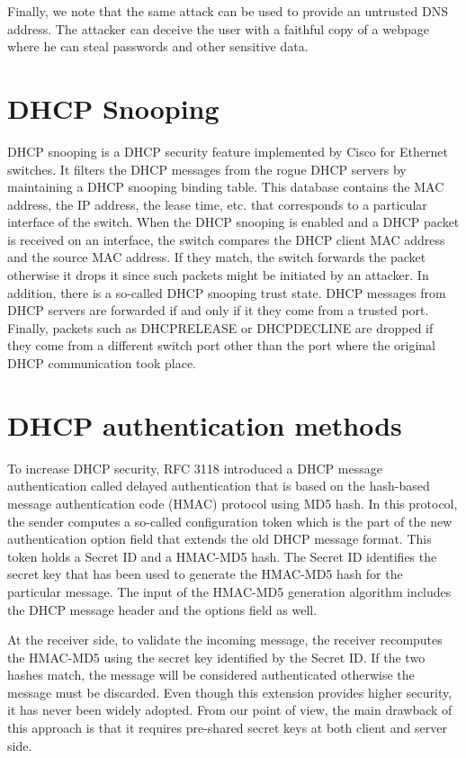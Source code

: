 \documentclass[letterpaper, 10 pt, conference]{ieeeconf}  %
\begin{document}
Finally, we note that the same attack can be used to provide an untrusted DNS address. The attacker can deceive the user with a faithful copy of a webpage where he can steal passwords and other sensitive data.
\section{DHCP Snooping}\label{sec:dhcp-snooping}
DHCP snooping is a DHCP security feature implemented by Cisco \cite{cisco} for Ethernet switches. It filters the DHCP messages from the rogue DHCP servers by maintaining a DHCP snooping binding table. This database contains the MAC address, the IP address, the lease time, etc. that corresponds to a particular interface of the switch. When the DHCP snooping is enabled and a DHCP packet is received on an interface, the switch compares the DHCP client MAC address and the source MAC address. If they match, the switch forwards the packet otherwise it drops it since such packets might be initiated by an attacker. In addition, there is a so-called DHCP snooping trust state. DHCP messages from DHCP servers are forwarded if and only if it they come from a trusted port. Finally, packets such as DHCPRELEASE or DHCPDECLINE are dropped if they come from a different switch port other than the port where the original DHCP communication took place.
\section{DHCP authentication methods}\label{sec:auth}
To increase DHCP security, RFC 3118 \cite{dhcpauthrfc} introduced a DHCP message authentication called delayed authentication that is based on the hash-based message authentication code (HMAC) protocol \cite{hmac} using MD5 hash. In this protocol, the sender computes a so-called configuration token which is the part of the new authentication option field that extends the old DHCP message format. This token holds a Secret ID and a HMAC-MD5 hash. The Secret ID identifies the secret key that has been used to generate the HMAC-MD5 hash for the particular message. The input of the HMAC-MD5 generation algorithm includes the DHCP message header and the options field as well.

At the receiver side, to validate the incoming message, the receiver recomputes the HMAC-MD5 using the secret key identified by the Secret ID. If the two hashes match, the message will be considered authenticated otherwise the message must be discarded. Even though this extension provides higher security, it has never been widely adopted. From our point of view, the main drawback of this approach is that it requires pre-shared secret keys at both client and server side.
\end{document}
